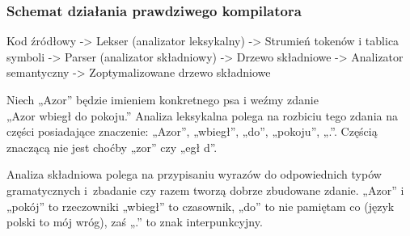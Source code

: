 \documentclass[10pt,t]{beamer}
\begin{document}












\begin{frame}
  \frametitle{Schemat działania prawdziwego kompilatora}







  Kod źródłowy -> Lekser (analizator leksykalny) -> Strumień tokenów i
  tablica symboli -> Parser (analizator składniowy) -> Drzewo
  składniowe -> Analizator semantyczny -> Zoptymalizowane drzewo składniowe

  Niech „Azor” będzie imieniem konkretnego psa i weźmy zdanie \\
  „Azor wbiegł do pokoju.”
  Analiza leksykalna polega na rozbiciu tego zdania na części
  posiadające znaczenie: „Azor”, „wbiegł”, „do”, „pokoju”, „.”. Częścią
  znaczącą nie jest choćby „zor” czy „egł d”.

  Analiza składniowa polega na przypisaniu wyrazów do odpowiednich typów
  gramatycznych i~zbadanie czy razem tworzą dobrze zbudowane zdanie.
  „Azor” i „pokój” to rzeczowniki „wbiegł” to czasownik, „do” to nie
  pamiętam co (język polski to mój wróg), zaś „.” to znak interpunkcyjny.

\end{frame}
\end{document}
